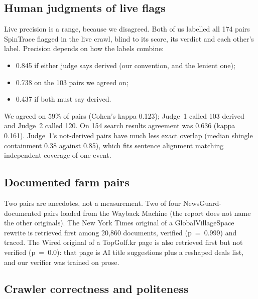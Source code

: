 \documentclass[11pt,a4paper]{article}
\begin{document}
\subsection{Human judgments of live flags}

Live precision is a range, because we disagreed. Both of us labelled all 174 pairs SpinTrace flagged in the live crawl, blind to its score, its verdict and each other's label. Precision depends on how the labels combine:
\begin{itemize}
  \item 0.845 if either judge says derived (our convention, and the lenient one);
  \item 0.738 on the 103 pairs we agreed on;
  \item 0.437 if both must say derived.
\end{itemize}
We agreed on 59\% of pairs (Cohen's kappa 0.123); Judge~1 called 103 derived and Judge~2 called 120. On 154 search results agreement was 0.636 (kappa 0.161). Judge~1's not-derived pairs have much less exact overlap (median shingle containment 0.38 against 0.85), which fits sentence alignment matching independent coverage of one event.

\subsection{Documented farm pairs}

Two pairs are anecdotes, not a measurement. Two of four NewsGuard-documented pairs loaded from the Wayback Machine (the report does not name the other originals). The New York Times original of a GlobalVillageSpace rewrite is retrieved first among 20,860 documents, verified (p~=~0.999) and traced. The Wired original of a TopGolf.kr page is also retrieved first but not verified (p~=~0.0): that page is AI title suggestions plus a reshaped deals list, and our verifier was trained on prose.

\subsection{Crawler correctness and politeness}
\end{document}
